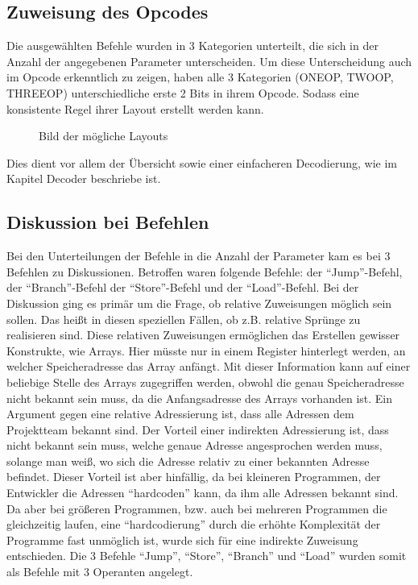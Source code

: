 \documentclass[paper=a4,fontsize=12pt,twocolumn]{scrreprt}
\begin{document}
\subsection{Zuweisung des Opcodes}

Die ausgewählten Befehle wurden in 3 Kategorien unterteilt, die sich in der Anzahl der angegebenen Parameter unterscheiden.
Um diese Unterscheidung auch im Opcode erkenntlich zu zeigen, haben alle 3 Kategorien (ONEOP, TWOOP, THREEOP) unterschiedliche erste 2 Bits in ihrem Opcode.
Sodass eine konsistente Regel ihrer Layout erstellt werden kann.

\begin{figure}[h]
\centering
\caption{Bild der mögliche Layouts}
\end{figure}

Dies dient vor allem der Übersicht sowie einer einfacheren Decodierung, wie im Kapitel Decoder beschriebe ist. 

\subsection{Diskussion bei Befehlen}

Bei den Unterteilungen der Befehle in die Anzahl der Parameter kam es bei 3 Befehlen zu Diskussionen.
Betroffen waren folgende Befehle: der \enquote{Jump}-Befehl, der \enquote{Branch}-Befehl der \enquote{Store}-Befehl und der \enquote{Load}-Befehl. 
Bei der Diskussion ging es primär um die Frage, ob relative Zuweisungen möglich sein sollen.
Das heißt in diesen speziellen Fällen, ob z.B. relative Sprünge zu realisieren sind.
Diese relativen Zuweisungen ermöglichen das Erstellen gewisser Konstrukte, wie Arrays.
Hier müsste nur in einem Register hinterlegt werden, an welcher Speicheradresse das Array anfängt.
Mit dieser Information kann auf einer beliebige Stelle des Arrays zugegriffen werden, obwohl die genau Speicheradresse nicht bekannt sein muss, da die Anfangsadresse des Arrays vorhanden ist.
Ein Argument gegen eine relative Adressierung ist, dass alle Adressen dem Projektteam bekannt sind.
Der Vorteil einer indirekten Adressierung ist, dass nicht bekannt sein muss, welche genaue Adresse angesprochen werden muss, solange man weiß, wo sich die Adresse relativ zu einer bekannten Adresse befindet.
Dieser Vorteil ist aber hinfällig, da bei kleineren Programmen, der Entwickler die Adressen \enquote{hardcoden} kann, da ihm alle Adressen bekannt sind. 
Da aber bei größeren Programmen, bzw. auch bei mehreren Programmen die gleichzeitig laufen, eine  \enquote{hardcodierung} durch die erhöhte Komplexität der Programme fast unmöglich ist, wurde sich für eine indirekte Zuweisung entschieden.
Die 3 Befehle \enquote{Jump}, \enquote{Store}, \enquote{Branch} und \enquote{Load} wurden somit als Befehle mit 3 Operanten angelegt.
\end{document}
